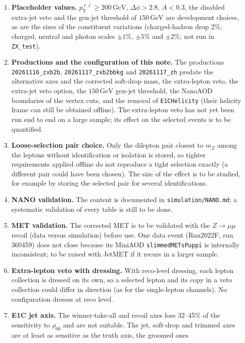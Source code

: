 \documentclass[11pt]{article}
\newcommand{\pt}{p_{\mathrm{T}}}
\newcommand{\GeV}{\ensuremath{\,\mathrm{GeV}}}
\newcommand{\ptll}{\pt^{\ell\ell}}
\newcommand{\code}[1]{\texttt{#1}}
\begin{document}
\begin{enumerate}
  definition of \code{PTLL} is to be confirmed from the generator configuration.
\item \textbf{Placeholder values.} $\ptll \geq 200\GeV$, $\Delta\phi > 2.8$, $A < 0.3$, the disabled extra-jet veto
  and the gen-jet threshold of $150\GeV$ are development choices, as are the sizes of the constituent variations
  (charged-hadron drop 2\%; charged, neutral and photon scales $\pm1\%$, $\pm5\%$ and $\pm2\%$; not run in
  \code{ZX\_test}).
\item \textbf{Productions and the configuration of this note.} The productions \code{20261116\_zxb2b},
  \code{20261117\_zxb2bbkg} and \code{20261117\_zh} predate the alternative axes and the corrected soft-drop mass, the
  extra-lepton veto, the extra-jet veto option, the $150\GeV$ gen-jet threshold, the NanoAOD boundaries of the vertex
  cuts, and the removal of \code{E1CHelicity} (their helicity frame can still be obtained offline). The extra-lepton
  veto has not yet been run end to end on a large sample; its effect on the selected events is to be quantified.
\item \textbf{Loose-selection pair choice.} Only the dilepton pair closest to $m_Z$ among the leptons without
  identification or isolation is stored, so tighter requirements applied offline do not reproduce a tight selection
  exactly (a different pair could have been chosen). The size of the effect is to be studied, for example by storing
  the selected pair for several identifications.
\item \textbf{NANO validation.} The content is documented in \code{simulation/NANO.md}; a systematic validation of
  every table is still to be done.
\item \textbf{MET validation.} The corrected MET is to be validated with the $Z\to\mu\mu$ recoil (data versus
  simulation) before use. One data event (Run2022F, run 360459) does not close because its MiniAOD
  \code{slimmedMETsPuppi} is internally inconsistent; to be raised with JetMET if it recurs in a larger sample.
\item \textbf{Extra-lepton veto with dressing.} With reco-level dressing, each lepton collection is dressed on its
  own, so a selected lepton and its copy in a veto collection could differ in direction (as for the single-lepton
  channels). No configuration dresses at reco level.
\item \textbf{E1C jet axis.} The winner-take-all and recoil axes lose 32--45\% of the sensitivity to $\rho_{00}$ and
  are not suitable. The jet, soft-drop and trimmed axes are at least as sensitive as the truth axis, the groomed ones

\end{enumerate}
\end{document}
